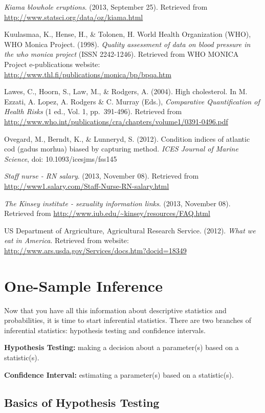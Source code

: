 \documentclass[]{book}
\begin{document}
\emph{Kiama blowhole eruptions}. (2013, September 25). Retrieved from
\url{http://www.statsci.org/data/oz/kiama.html}

Kuulasmaa, K., Hense, H., \& Tolonen, H. World Health Organization (WHO),
WHO Monica Project. (1998). \emph{Quality assessment of data on blood
pressure in the who monica project} (ISSN 2242-1246). Retrieved from WHO
MONICA Project e-publications website:
\url{http://www.thl.fi/publications/monica/bp/bpqa.htm}

Lawes, C., Hoorn, S., Law, M., \& Rodgers, A. (2004). High cholesterol.
In M. Ezzati, A. Lopez, A. Rodgers \& C. Murray (Eds.), \emph{Comparative
Quantification of Health Risks} (1 ed., Vol. 1, pp.~391-496). Retrieved
from
\url{http://www.who.int/publications/cra/chapters/volume1/0391-0496.pdf}

Ovegard, M., Berndt, K., \& Lunneryd, S. (2012). Condition indices of
atlantic cod (gadus morhua) biased by capturing method. \emph{ICES Journal of
Marine Science}, doi: 10.1093/icesjms/fss145

\emph{Staff nurse - RN salary}. (2013, November 08). Retrieved from
\url{http://www1.salary.com/Staff-Nurse-RN-salary.html}

\emph{The Kinsey institute - sexuality information links}. (2013, November
08). Retrieved from \url{http://www.iub.edu/~kinsey/resources/FAQ.html}

US Department of Argriculture, Agricultural Research Service. (2012).
\emph{What we eat in America}. Retrieved from website:
\url{http://www.ars.usda.gov/Services/docs.htm?docid=18349}

\hypertarget{one-sample-inference}{%
\chapter{One-Sample Inference}\label{one-sample-inference}}

Now that you have all this information about descriptive statistics and probabilities, it is time to start inferential statistics. There are two branches of inferential statistics: hypothesis testing and confidence intervals.

\textbf{Hypothesis Testing:} making a decision about a parameter(s) based on a statistic(s).

\textbf{Confidence Interval:} estimating a parameter(s) based on a statistic(s).

\hypertarget{basics-of-hypothesis-testing}{%
\section{Basics of Hypothesis Testing}\label{basics-of-hypothesis-testing}}
\end{document}

